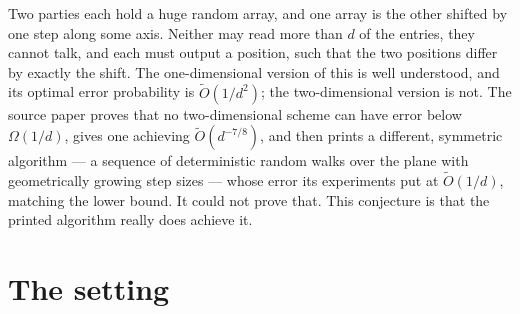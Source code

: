\documentclass{conjura-conjecture}
\newcommand{\Ot}{\widetilde{O}}
\begin{document}

\vspace{0.4em}

\begin{informalconjecture}
Two parties each hold a huge random array, and one array is the other
shifted by one step along some axis. Neither may read more than $d$ of
the entries, they cannot talk, and each must output a position, such
that the two positions differ by exactly the shift. The one-dimensional
version of this is well understood, and its optimal error probability
is $\Ot(1/d^{2})$; the two-dimensional version is not. The source paper
proves that no two-dimensional scheme can have error below
$\Omega(1/d)$, gives one achieving $\Ot(d^{-7/8})$, and then prints a
different, symmetric algorithm --- a sequence of deterministic random
walks over the plane with geometrically growing step sizes --- whose
error its experiments put at $\Ot(1/d)$, matching the lower bound. It
could not prove that. This conjecture is that the printed algorithm
really does achieve it.
\end{informalconjecture}

\section{The setting}\label{sec:setting}
\end{document}

